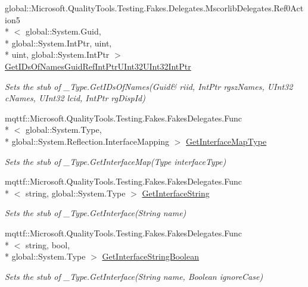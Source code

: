\begin{DoxyCompactItemize}
global\-::\-Microsoft.\-Quality\-Tools.\-Testing.\-Fakes.\-Delegates.\-Mscorlib\-Delegates.\-Ref0\-Action5\\*
$<$ global\-::\-System.\-Guid, \\*
global\-::\-System.\-Int\-Ptr, uint, \\*
uint, global\-::\-System.\-Int\-Ptr $>$ \hyperlink{class_system_1_1_runtime_1_1_interop_services_1_1_fakes_1_1_stub___type_a7386763f8b7ee38f5a960f487c70147f}{Get\-I\-Ds\-Of\-Names\-Guid\-Ref\-Int\-Ptr\-U\-Int32\-U\-Int32\-Int\-Ptr}
\begin{DoxyCompactList}\small\item\em Sets the stub of \-\_\-\-Type.\-Get\-I\-Ds\-Of\-Names(Guid\& riid, Int\-Ptr rgsz\-Names, U\-Int32 c\-Names, U\-Int32 lcid, Int\-Ptr rg\-Disp\-Id)\end{DoxyCompactList}\item 
mqttf\-::\-Microsoft.\-Quality\-Tools.\-Testing.\-Fakes.\-Fakes\-Delegates.\-Func\\*
$<$ global\-::\-System.\-Type, \\*
global\-::\-System.\-Reflection.\-Interface\-Mapping $>$ \hyperlink{class_system_1_1_runtime_1_1_interop_services_1_1_fakes_1_1_stub___type_a5a55ea2447ffcd6f19fde1d08c8705e4}{Get\-Interface\-Map\-Type}
\begin{DoxyCompactList}\small\item\em Sets the stub of \-\_\-\-Type.\-Get\-Interface\-Map(\-Type interface\-Type)\end{DoxyCompactList}\item 
mqttf\-::\-Microsoft.\-Quality\-Tools.\-Testing.\-Fakes.\-Fakes\-Delegates.\-Func\\*
$<$ string, global\-::\-System.\-Type $>$ \hyperlink{class_system_1_1_runtime_1_1_interop_services_1_1_fakes_1_1_stub___type_a41c943432327b94d168a2defc6a64a6d}{Get\-Interface\-String}
\begin{DoxyCompactList}\small\item\em Sets the stub of \-\_\-\-Type.\-Get\-Interface(\-String name)\end{DoxyCompactList}\item 
mqttf\-::\-Microsoft.\-Quality\-Tools.\-Testing.\-Fakes.\-Fakes\-Delegates.\-Func\\*
$<$ string, bool, \\*
global\-::\-System.\-Type $>$ \hyperlink{class_system_1_1_runtime_1_1_interop_services_1_1_fakes_1_1_stub___type_a9cbf666bec109caa35719b850d55b8b3}{Get\-Interface\-String\-Boolean}
\begin{DoxyCompactList}\small\item\em Sets the stub of \-\_\-\-Type.\-Get\-Interface(\-String name, Boolean ignore\-Case)\end{DoxyCompactList}\item 

\end{DoxyCompactItemize}

